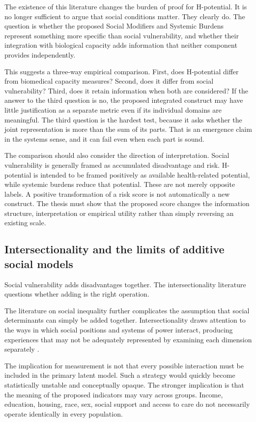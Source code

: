 The existence of this literature changes the burden of proof for H-potential. It is no longer sufficient to argue that social conditions matter. They clearly do. The question is whether the proposed Social Modifiers and Systemic Burdens represent something more specific than social vulnerability, and whether their integration with biological capacity adds information that neither component provides independently.

This suggests a three-way empirical comparison. First, does H-potential differ from biomedical capacity measures? Second, does it differ from social vulnerability? Third, does it retain information when both are considered? If the answer to the third question is no, the proposed integrated construct may have little justification as a separate metric even if its individual domains are meaningful. The third question is the hardest test, because it asks whether the joint representation is more than the sum of its parts. That is an emergence claim in the systems sense, and it can fail even when each part is sound.

The comparison should also consider the direction of interpretation. Social vulnerability is generally framed as accumulated disadvantage and risk. H-potential is intended to be framed positively as available health-related potential, while systemic burdens reduce that potential. These are not merely opposite labels. A positive transformation of a risk score is not automatically a new construct. The thesis must show that the proposed score changes the information structure, interpretation or empirical utility rather than simply reversing an existing scale.

\subsection{Intersectionality and the limits of additive social models}

Social vulnerability adds disadvantages together. The intersectionality literature questions whether adding is the right operation.

The literature on social inequality further complicates the assumption that social determinants can simply be added together. Intersectionality draws attention to the ways in which social positions and systems of power interact, producing experiences that may not be adequately represented by examining each dimension separately \citep{crenshaw_1991,bowleg_2008}.

The implication for measurement is not that every possible interaction must be included in the primary latent model. Such a strategy would quickly become statistically unstable and conceptually opaque. The stronger implication is that the meaning of the proposed indicators may vary across groups. Income, education, housing, race, sex, social support and access to care do not necessarily operate identically in every population.


